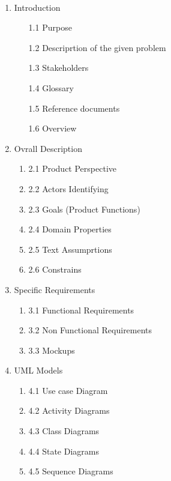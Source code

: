 \documentclass{article}
\begin{document}
   \\
\begin{enumerate}

\item Introduction




\begin {enumerate}
\item [1.1] Purpose
\item [1.2] Descriprtion of the given problem
\item [1.3] Stakeholders
\item [1.4] Glossary
\item [1.5] Reference documents
\item [1.6] Overview
\end{enumerate}

\item Ovrall Description
\begin {enumerate}
\item [2.1] Product Perspective
\item [2.2] Actors Identifying
\item [2.3] Goals (Product Functions)
\item [2.4] Domain Properties
\item [2.5] Text Assumprtions
\item [2.6] Constrains 
\end {enumerate} 


\item Specific Requirements
\begin {enumerate}
\item [3.1]  Functional Requirements
\item [3.2] Non Functional Requirements
\item [3.3] Mockups

\end {enumerate} 


\item UML Models
\begin {enumerate}
\item [4.1] Use case Diagram
\item [4.2] Activity Diagrams
\item [4.3] Class Diagrams
\item [4.4] State Diagrams
\item [4.5] Sequence Diagrams

\end {enumerate} 



\end{enumerate}
\end{document}
